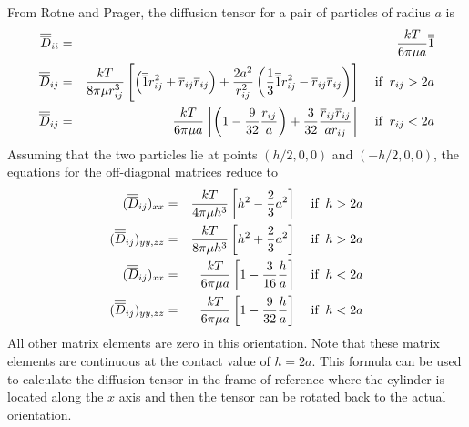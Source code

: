 \documentclass[12pt]{article}
\begin{document}
%

From Rotne and Prager, the diffusion tensor for a pair of
particles of radius $a$ is
\begin{eqnarray*}
\overline{\overline{D}}_{ii} & = & \frac{kT}{6\pi\mu a}\overline{\overline{1}} \\
\overline{\overline{D}}_{ij} & = & \frac{kT}{8\pi\mu r_{ij}^3}\left[\left(\overline{\overline{1}} r_{ij}^2 +\overline{r}_{ij}
\overline{r}_{ij}\right) +\frac{2a^2}{r_{ij}^2}\left(\frac{1}{3}\overline{\overline{1}} r_{ij}^2
-\overline{r}_{ij}\overline{r}_{ij}\right)\right] \;\;\;\; \mbox{if}\;\; r_{ij} > 2a \\
\overline{\overline{D}}_{ij} & = & \frac{kT}{6\pi\mu a}\left[\left(1-\frac{9}{32}\frac{r_{ij}}{a}\right)
+\frac{3}{32}\frac{\overline{r}_{ij}\overline{r}_{ij}}{ar_{ij}}\right] \;\;\;\; \mbox{if} \;\; r_{ij}<2a
\end{eqnarray*}
Assuming that the two particles lie at points $(h/2,0,0)$ and $(-h/2,0,0)$,
the equations for the off-diagonal matrices reduce to
\begin{eqnarray*}
(\overline{\overline{D}}_{ij})_{xx} & = & \frac{kT}{4\pi\mu h^3}\left[h^2-\frac{2}{3}a^2\right]
 \;\;\;\;\mbox{if}\;\;h>2a \\
(\overline{\overline{D}}_{ij})_{yy,zz} & = & \frac{kT}{8\pi\mu h^3}\left[h^2+\frac{2}{3}a^2\right]
 \;\;\;\;\mbox{if}\;\;h>2a \\
(\overline{\overline{D}}_{ij})_{xx} & = & \frac{kT}{6\pi\mu a}\left[1-\frac{3}{16}\frac{h}{a}\right]
 \;\;\;\;\mbox{if}\;\;h<2a \\
(\overline{\overline{D}}_{ij})_{yy,zz} & = & \frac{kT}{6\pi\mu a}\left[1-\frac{9}{32}\frac{h}{a}\right]
 \;\;\;\;\mbox{if}\;\;h<2a
\end{eqnarray*}
All other matrix elements are zero in this orientation. Note that these matrix
elements are continuous at the contact value of $h=2a$. This formula can be used to
calculate the diffusion tensor in the frame of reference where the cylinder is located
along the $x$ axis and then the tensor can be rotated back to the actual orientation.
\end{document}
